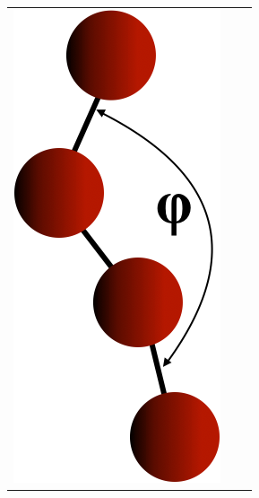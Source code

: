 \documentclass[9pt,bestpractices]{livecoms}
\begin{document}
\begin{table}
\begin{tabularx}{\textwidth}{
p{}
p{}
p{}}
\includegraphics[width=\linewidth]{gfx/image32-2.png}\vspace{-20pt} & 

\end{tabularx}
\end{table}
\end{document}
